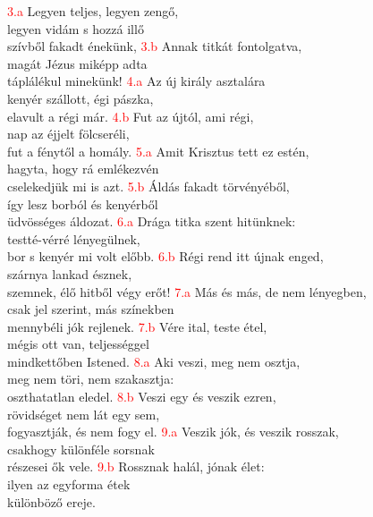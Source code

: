 \documentclass[twoside]{article}
\begin{document}
\begin{hymnstanzas}
    \textcolor{red}{3.a} Legyen teljes, legyen zengő,\\
    legyen vidám s hozzá illő\\
    szívből fakadt énekünk,
\stanzabreak
    \textcolor{red}{3.b} Annak titkát fontolgatva,\\
    magát Jézus miképp adta\\
    táplálékul minekünk!
\stanzabreak
    \textcolor{red}{4.a} Az új király asztalára\\
    kenyér szállott, égi pászka,\\
    elavult a régi már.
\stanzabreak
    \textcolor{red}{4.b} Fut az újtól, ami régi,\\
    nap az éjjelt fölcseréli,\\
    fut a fénytől a homály.
\stanzabreak
    \textcolor{red}{5.a} Amit Krisztus tett ez estén,\\
    hagyta, hogy rá emlékezvén\\
    cselekedjük mi is azt.
\stanzabreak
    \textcolor{red}{5.b} Áldás fakadt törvényéből,\\
    így lesz borból és kenyérből\\
    üdvösséges áldozat.
\stanzabreak
    \textcolor{red}{6.a} Drága titka szent hitünknek:\\
    testté-vérré lényegülnek,\\
    bor s kenyér mi volt előbb.
\stanzabreak
    \textcolor{red}{6.b} Régi rend itt újnak enged,\\
    szárnya lankad észnek,\\
    szemnek, élő hitből végy erőt!
\stanzabreak
    \textcolor{red}{7.a} Más és más, de nem lényegben,\\
    csak jel szerint, más színekben\\
    mennybéli jók rejlenek.
\stanzabreak
    \textcolor{red}{7.b} Vére ital, teste étel,\\
    mégis ott van, teljességgel\\
    mindkettőben Istened.
\stanzabreak
    \textcolor{red}{8.a} Aki veszi, meg nem osztja,\\
    meg nem töri, nem szakasztja:\\
    oszthatatlan eledel.
\stanzabreak
    \textcolor{red}{8.b} Veszi egy és veszik ezren,\\
    rövidséget nem lát egy sem,\\
    fogyasztják, és nem fogy el.
\stanzabreak
    \textcolor{red}{9.a} Veszik jók, és veszik rosszak,\\
    csakhogy különféle sorsnak\\
    részesei ők vele.
\stanzabreak
    \textcolor{red}{9.b} Rossznak halál, jónak élet:\\
    ilyen az egyforma étek\\
    különböző ereje.
\end{hymnstanzas}
\end{document}
